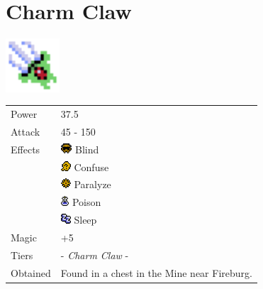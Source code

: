 \section{Charm Claw}
\label{weapon:charm_claw}

\includegraphics[height=2cm,keepaspectratio]{./resources/weapons/charmclaw}

\begin{longtable}{ l p{9cm} }
	Power
	& 37.5
\\ %
	Attack
	& 45 - 150
\\ %
	Effects
	& \includegraphics[height=1em,keepaspectratio]{./resources/effects/blind}
	Blind \\
	& \includegraphics[height=1em,keepaspectratio]{./resources/effects/confusion}
	Confuse \\
	& \includegraphics[height=1em,keepaspectratio]{./resources/effects/paralyze}
	Paralyze \\
	& \includegraphics[height=1em,keepaspectratio]{./resources/effects/poison}
	Poison \\
	& \includegraphics[height=1em,keepaspectratio]{./resources/effects/sleep}
	Sleep
\\ %
	Magic
	& +5
\\ %
	Tiers
	& \nameref{weapon:cat_claw} - \textit{Charm Claw} - \nameref{weapon:dragon_claw}
\\ %
	Obtained
	& Found in a chest in the Mine near Fireburg.
\end{longtable}
